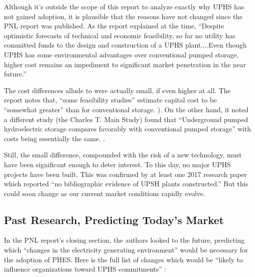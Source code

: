 \documentclass[hidelinks,12pt,a4paper]{article}
\begin{document}
Although it's outside the scope of this report to analyze exactly why UPHS has not gained adoption, it is plausible that the reasons have not changed since the PNL report was published. As the report explained at the time, “Despite optimistic forecasts of technical and economic feasibility, so far no utility has committed funds to the design and construction of a UPHS plant....Even though UPHS has some environmental advantages over conventional pumped storage, higher cost remains an impediment to significant market penetration in the near future.” \cite{SubSurfacePumpedHydroelectricStorage}

The cost differences allude to were actually small, if even higher at all. The report notes that, “some feasibility studies” estimate capital cost to be “somewhat greater” than for conventional storage. \cite{SubSurfacePumpedHydroelectricStorage}). On the other hand, it noted a different study (the Charles T. Main Study) found that “Underground pumped hydroelectric storage compares favorably with conventional pumped storage” with costs being essentially the same. \cite{SubSurfacePumpedHydroelectricStorage}.


Still, the small difference, compounded with the risk of a new technology, must have been significant enough to deter interest. To this day, no major UPHS projects have been built. This was confirmed by at least one 2017 research paper which reported “no bibliographic evidence of UPSH plants constructed.” \cite{UndergroundPumpedStorageHydropowerPlantsUsingOpenPitMines}
But this could soon change as our current market conditions rapidly evolve.

\subsection{Past Research, Predicting Today's Market}
In the PNL report's closing section, the authors looked to the future, predicting which “changes in the electricity generating environment” would be necessary for the adoption of PHES. Here is the full list of changes which would be “likely to influence organizations toward UPHS commitments” \cite{SubSurfacePumpedHydroelectricStorage}:
\end{document}
